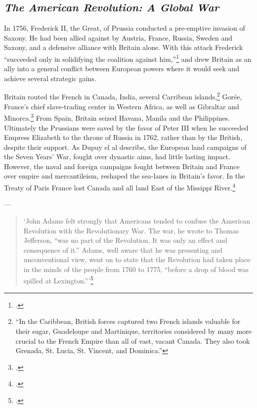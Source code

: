 \subsection{\emph{The American Revolution: A Global War}}

In 1756, Frederick II, the Great, of Prussia conducted a pre-emptive invasion of Saxony. He had been allied against by Austria, France, Russia, Sweden and Saxony, and a defensive alliance with Britain alone. With this attack Frederick ``succeeded only in solidifying the coalition against him,''\footcite{dupuy_1977} and drew Britain as an ally into a general conflict between European powers where it would seek and achieve several strategic gains.

Britain routed the French in Canada, India, several Carribean islands,\footnote{``In the Caribbean, British forces captured two French islands valuable for their sugar, Guadeloupe and Martinique, territories considered by many more crucial to the French Empire than all of vast, vacant Canada. They also took Grenada, St. Lucia, St. Vincent, and Dominica.''\cite[8]{dupuy_1977}} Gor\'ee, France's chief slave-trading center in Western Africa, as well as Gibraltar and Minorca.\footcite[7-9]{dupuy_1977} From Spain, Britain seized Havana, Manila and the Philippines. Ultimately the Prussians were saved by the favor of Peter III when he succeeded Empress Elizabeth to the throne of Russia in 1762, rather than by the British, despite their support. As Dupuy el al describe, the European land campaigns of the Seven Years' War, fought over dynastic aims, had little lasting impact. However, the naval and foreign campaigns fought between Britain and France over empire and mercantileism, reshaped the sea-lanes in Britain's favor. In the Treaty of Paris France lost Canada and all land East of the Missippi River.\footcite[10]{dupuy_1977}

--- 

\begin{quote}
`John Adams felt strongly that Americans tended to confuse the American Revolution with the Revolutionary War. The war, he wrote to Thomas Jefferson, ``was no part of the Revolution. It was only an effect and consequence of it.'' Adams, well aware that he was presenting and unconventional view, went on to state that the Revolution had taken place in the minds of the people from 1760 to 1775, ``before a drop of blood was spilled at Lexington.'''\footcite[15]{dupuy_1977}
\end{quote}